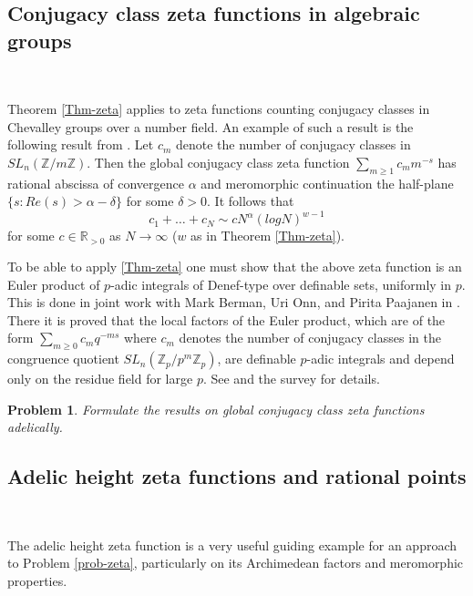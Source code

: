 \documentclass[12pt]{amsart}
\def\R{\mathbb{R}}
\def\Z{\mathbb{Z}}
\def\R{\mathbb{R}}
\numberwithin{equation}{section}
\newtheorem{prob}{Problem}[section]
\begin{document}
\medskip

\subsection{\bf Conjugacy class zeta functions in algebraic groups}\label{ssec-conj}

\

\medskip

Theorem \ref{Thm-zeta} applies to zeta functions counting conjugacy classes in Chevalley groups over a number field. An example of such a result is the following result from \cite{zeta1}. Let $c_m$ denote the number of conjugacy classes in 
$SL_n(\Z/m\Z)$. Then the global conjugacy class 
zeta function $\sum_{m\geq 1} c_m m^{-s}$ has rational abscissa of convergence $\alpha$ and 
meromorphic continuation the half-plane $\{s: Re(s)>\alpha -\delta\}$ for some $\delta>0$. It follows that
$$c_1+\dots+c_N \sim c N^{\alpha} (log N)^{w-1}$$
for some $c\in \R_{>0}$ as $N\rightarrow \infty$ ($w$ as in Theorem \ref{Thm-zeta}). 

To be able to apply \ref{Thm-zeta} one must show that the above zeta function is an Euler product of $p$-adic integrals of Denef-type over definable sets, uniformly in $p$. This is done in joint work with Mark Berman, Uri Onn, and Pirita Paajanen in 
\cite{BDOP}. There it is proved that the local factors of the Euler product, which are of the form $\sum_{m\geq 0} c_m q^{-ms}$ where 
$c_m$ denotes the number of conjugacy classes in the congruence quotient $SL_n(\Z_p/p^m \Z_p)$, are definable $p$-adic integrals and depend only on the residue field for large $p$. See \cite{BDOP} and the survey 
\cite{zeta-surv} for details.

\begin{prob} Formulate the results on global conjugacy class zeta functions adelically.\end{prob}



\subsection{\bf Adelic height zeta functions and rational points}

\

\medskip

The adelic height zeta function is a very useful guiding example for an approach to Problem \ref{prob-zeta}, particularly on its Archimedean factors and meromorphic properties. 
\end{document}
